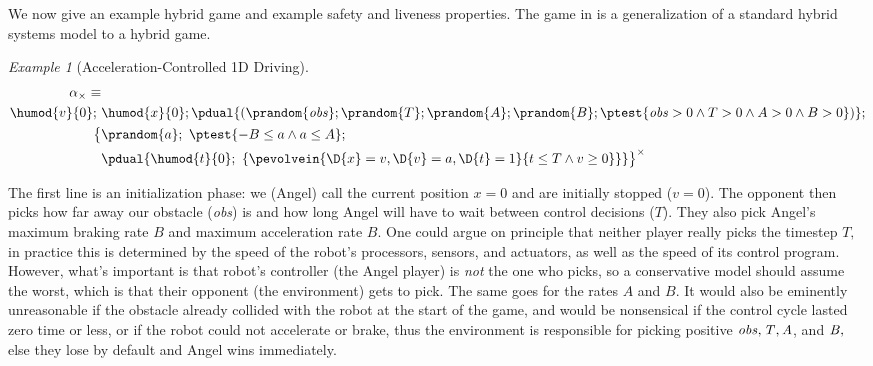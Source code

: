 \documentclass[12pt]{cmuthesis}
\theoremstyle{definition}
\theoremstyle{remark}
\newtheorem{example}{Example}
\newcommand{\rref}[2][]{\prettyref{#2}}
\begin{document}
We now give an example hybrid game and example safety and liveness properties.
The game in \rref{ex:driving-game} is a generalization of a standard hybrid systems model to a hybrid game.
\newcommand{\obsvar}{{\it obs}\xspace}
\newcommand{\Tvar}{{\it T}\xspace}
\newcommand{\Avar}{{\it A}\xspace}
\newcommand{\Bvar}{{\it B}\xspace}
\newcommand{\xvar}{{\it x}\xspace}
\newcommand{\vvar}{{\it v}\xspace}
\newcommand{\avar}{{\it a}\xspace}
\begin{example}[Acceleration-Controlled 1D Driving]
\label{ex:driving-game}
\begin{align}
\alpha_\times\equiv&\\
\label{eq:driving-init}\humod{v}{0};~&\humod{x}{0};\pdual{(\prandom{\obsvar};\prandom{T};\prandom{A};\prandom{B}; \ptest{\obsvar > 0 \land T > 0 \land A > 0 \land B > 0})};\\
\label{eq:driving-angel}\big\{ &\prandom{a};~\ptest{-B \leq a \land a \leq A};\\ 
\label{eq:driving-demon}       &\pdual{\humod{t}{0};~\{\pevolvein{\D{x}=v, \D{v}=a, \D{t}=1}{t \leq T \land v \geq 0}\}}\big\}^\times
\end{align}
\end{example}
The first line \rref{eq:driving-init} is an initialization phase: we (Angel) call the current position $x = 0$ and are initially stopped ($v = 0$).
The opponent then picks how far away our obstacle (\obsvar) is and how long Angel will have to wait between control decisions ($T$).
They also pick Angel's maximum braking rate $B$ and maximum acceleration rate $B$.
One could argue on principle that neither player really picks the timestep $T,$ in practice this is determined by the speed of the robot's processors, sensors, and actuators, as well as the speed of its control program.
However, what's important is that robot's controller (the Angel player) is \emph{not} the one who picks, so a conservative model should assume the worst, which is that their opponent (the environment) gets to pick.
The same goes for the rates $A$ and $B$.
It would also be eminently unreasonable if the obstacle already collided with the robot at the start of the game, and would be nonsensical if the control cycle lasted zero time or less, or if the robot could not accelerate or brake, thus the environment is responsible for picking positive $\obsvar, \Tvar, \Avar$, and  $\Bvar,$ else they lose by default and Angel wins immediately.
\end{document}
